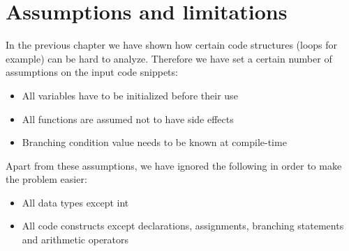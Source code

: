 \section{Assumptions and limitations}
\label{sec:AssumptionsAndLimitations}

In the previous chapter we have shown how certain code structures (loops for example) can be hard to analyze. Therefore we have set a certain number of assumptions on the input code snippets:

\begin{itemize}
    \item All variables have to be initialized before their use
    \item All functions are assumed not to have side effects
    \item Branching condition value needs to be known at compile-time
\end{itemize}

Apart from these assumptions, we have ignored the following in order to make the problem easier:

\begin{itemize}
    \item All data types except int
    \item All code constructs except declarations, assignments, branching statements and arithmetic operators
\end{itemize}


\cite{DBLP:conf/kbse/FalleriMBMM14}
